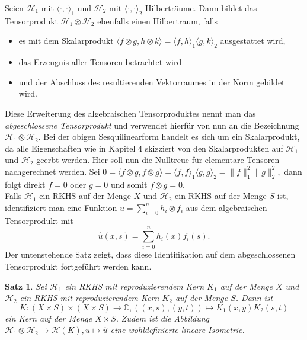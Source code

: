 \documentclass[12pt,titlepage,twoside,cleardoublepage]{article}
\theoremstyle{nummermitklammern}
\newtheorem{satz}[temp]{Satz}
\newtheorem{satz}[zahl]{Satz}
\numberwithin{equation}{section}
\begin{document}
Seien $\mathcal{H}_1$ mit $\langle\cdot,\cdot \rangle_1$ und $\mathcal{H}_2$ mit $\langle\cdot,\cdot\rangle_2$ Hilberträume. Dann bildet das Tensorprodukt $\mathcal{H}_1\otimes \mathcal{H}_2$ ebenfalls einen Hilbertraum, falls
\begin{itemize}
\item 
 es mit dem Skalarprodukt $
\langle f\otimes g,h\otimes k\rangle=\langle f,h\rangle_1\langle g,k\rangle_2$
ausgestattet wird,
\item das Erzeugnis aller Tensoren betrachtet wird
\item und der Abschluss des resultierenden Vektorraumes in der Norm gebildet wird.
\end{itemize} 
Diese Erweiterung des algebraischen Tensorproduktes nennt man das \emph{abgeschlossene Tensorprodukt} und verwendet hierfür von nun an die Bezeichnung $\mathcal{H}_1\otimes \mathcal{H}_2.$ Bei der obigen Sesquilinearform handelt es sich um ein Skalarprodukt, da alle Eigenschaften wie in Kapitel 4 skizziert von den Skalarprodukten auf $\mathcal{H}_1$ und $\mathcal{H}_2$ geerbt werden. Hier soll nun die Nulltreue für elementare Tensoren nachgerechnet werden. Sei $0=\langle f\otimes g,f\otimes g\rangle =\langle f,f\rangle_1\langle g,g\rangle_2 =\|f\|_1^2\|g\|_2^2,$ dann folgt direkt $f=0$ oder $g=0$ und somit $f\otimes g=0.$\\
Falls $\mathcal{H}_1$ ein RKHS auf der Menge $X$ und $\mathcal{H}_2$ ein RKHS auf der Menge $S$ ist, identifiziert man eine Funktion $u=\sum_{i=0}^nh_i\otimes f_i$ aus dem algebraischen Tensorprodukt mit
\[
\hat{u}(x,s)=\sum_{i=0}^nh_i(x)f_i(s).
\] 
Der untenstehende Satz zeigt, dass diese Identifikation auf dem abgeschlossenen Tensorprodukt fortgeführt werden kann.
\begin{satz}
Sei $\mathcal{H}_1$ ein RKHS mit reproduzierendem Kern $K_1$ auf der Menge $X$ und $\mathcal{H}_2$ ein RKHS mit reproduzierendem Kern $K_2$ auf der Menge $S$. Dann ist 
\[
K:(X\times S)\times (X \times S)\to \mathbb{C},((x,s),(y,t))\mapsto K_1(x,y)K_2(s,t) 
\] 
ein Kern auf der Menge $X\times S.$ Zudem ist die Abbildung $\mathcal{H}_1 \otimes \mathcal{H}_2 \to  \mathcal{H}(K), u\mapsto \hat{u}$ eine wohldefinierte lineare Isometrie.
\end{satz}
\end{document}
